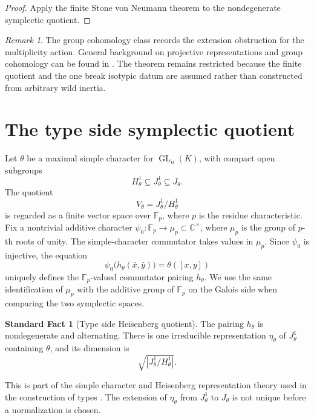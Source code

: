 \documentclass[11pt]{amsart}
\theoremstyle{definition}
\newtheorem{standardfact}[standardfact]{Standard Fact}
\theoremstyle{remark}
\newtheorem{remark}[remark]{Remark}
\newcommand{\CC}{\mathbb C}
\newcommand{\FF}{\mathbb F}
\newcommand{\GL}{\operatorname{GL}}
\newcommand{\abs}[1]{\left\lvert#1\right\rvert}
\begin{document}
\begin{proof}
Apply the finite Stone von Neumann theorem to the nondegenerate symplectic quotient.
\end{proof}

\begin{remark}\label{rem:clifford_scope}
The group cohomology class records the extension obstruction for the multiplicity action. General background on projective representations and group cohomology can be found in \cite{Karpilovsky1985,Brown1982}. The theorem remains restricted because the finite quotient and the one break isotypic datum are assumed rather than constructed from arbitrary wild inertia.
\end{remark}

\section{The type side symplectic quotient}\label{sec:typeside}

Let \(\theta\) be a maximal simple character for \(\GL_n(K)\), with compact open subgroups
\[
H_\theta^1\subseteq J_\theta^1\subseteq J_\theta.
\]
The quotient
\[
V_\theta=J_\theta^1/H_\theta^1
\]
is regarded as a finite vector space over \(\FF_p\), where \(p\) is the residue characteristic. Fix a nontrivial additive character \(\psi_0:\FF_p\to\mu_p\subset\CC^\times\), where \(\mu_p\) is the group of \(p\)-th roots of unity. The simple-character commutator takes values in \(\mu_p\). Since \(\psi_0\) is injective, the equation
\[
\psi_0\bigl(h_\theta(\bar x,\bar y)\bigr)
=
\theta([x,y])
\]
uniquely defines the \(\FF_p\)-valued commutator pairing \(h_\theta\). We use the same identification of \(\mu_p\) with the additive group of \(\FF_p\) on the Galois side when comparing the two symplectic spaces.

\begin{standardfact}[Type side Heisenberg quotient]\label{fact:type_heisenberg}
The pairing \(h_\theta\) is nondegenerate and alternating. There is one irreducible representation \(\eta_\theta\) of \(J_\theta^1\) containing \(\theta\), and its dimension is
\[
\sqrt{\abs{J_\theta^1/H_\theta^1}}.
\]
\end{standardfact}

This is part of the simple character and Heisenberg representation theory used in the construction of types \cite{BushnellKutzko1993}. The extension of \(\eta_\theta\) from \(J_\theta^1\) to \(J_\theta\) is not unique before a normalization is chosen.
\end{document}
